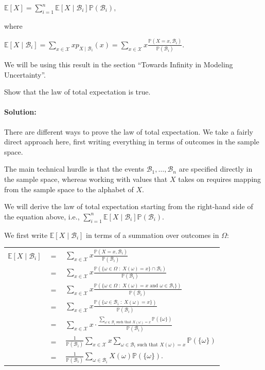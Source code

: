 \documentclass[6008notes.tex]{subfiles}
\begin{document}
{\centering$\mathbb {E}[X]=\sum _{i=1}^{n}\mathbb {E}[X\mid \mathcal{B}_{i}]\mathbb {P}(\mathcal{B}_{i}),$ \par}
 
where

{\centering$\mathbb {E}[X\mid \mathcal{B}_{i}] = \sum _{x\in \mathcal{X}}xp_{X\mid \mathcal{B}_{i}}(x) = \sum _{x\in \mathcal{X}}x\frac{\mathbb {P}(X=x,\mathcal{B}_{i})}{\mathbb {P}(\mathcal{B}_{i})}.$ \par}
 
We will be using this result in the section ``Towards Infinity in Modeling Uncertainty''.

Show that the law of total expectation is true.

\paragraph{Solution:} There are different ways to prove the law of total expectation. We take a fairly direct approach here, first writing everything in terms of outcomes in the sample space.

The main technical hurdle is that the events $\mathcal{B}_{1},\dots ,\mathcal{B}_{n}$ are specified directly in the sample space, whereas working with values that $X$ takes on requires mapping from the sample space to the alphabet of $X$.

We will derive the law of total expectation starting from the right-hand side of the equation above, i.e., $\sum _{i=1}^{n}\mathbb {E}[X\mid \mathcal{B}_{i}]\mathbb {P}(\mathcal{B}_{i})$.

We first write $\mathbb {E}[X\mid \mathcal{B}_{i}]$ in terms of a summation over outcomes in $\Omega$:

{\renewcommand{\arraystretch}{1.5}
\begin{tabular}{l l l}
$\mathbb {E}[X\mid \mathcal{B}_{i}]$ & $=$ & $\sum _{x\in \mathcal{X}}x\frac{\mathbb {P}(X=x,\mathcal{B}_{i})}{\mathbb {P}(\mathcal{B}_{i})}$ \\
  & $=$ & $\sum _{x\in \mathcal{X}}x\frac{\mathbb {P}(\{ \omega \in \Omega \; :\; X(\omega )=x\} \cap \mathcal{B}_{i})}{\mathbb {P}(\mathcal{B}_{i})}$ \\
  & $=$ & $\sum _{x\in \mathcal{X}}x\frac{\mathbb {P}(\{ \omega \in \Omega \; :\; X(\omega )=x\text { and }\omega \in \mathcal{B}_{i}\} )}{\mathbb {P}(\mathcal{B}_{i})}$ \\
  & $=$ & $\sum _{x\in \mathcal{X}}x\frac{\mathbb {P}(\{ \omega \in \mathcal{B}_{i}\; :\; X(\omega )=x\} )}{\mathbb {P}(\mathcal{B}_{i})}$ \\
  & $=$ & $\sum _{x\in \mathcal{X}}x\cdot \frac{\sum _{\omega \in \mathcal{B}_{i}\text { such that }X(\omega )=x}\mathbb {P}(\{ \omega \} )}{\mathbb {P}(\mathcal{B}_{i})}$ \\
  & $=$ & $\frac{1}{\mathbb {P}(\mathcal{B}_{i})}\sum _{x\in \mathcal{X}}x\sum _{\omega \in \mathcal{B}_{i}\text { such that }X(\omega )=x}\mathbb {P}(\{ \omega \} )$ \\
  & $=$ & $\frac{1}{\mathbb {P}(\mathcal{B}_{i})}\sum _{\omega \in \mathcal{B}_{i}}X(\omega )\mathbb {P}(\{ \omega \} ).$ 
\end{tabular}}
		
\end{document}
